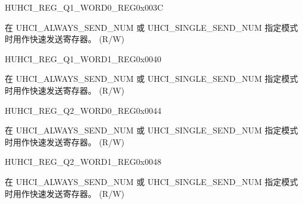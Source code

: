 \begin{register}{H}{UHCI\_REG\_Q1\_WORD0\_REG}{0x003C}\label{regdesc:UHCIREGQ1WORD0REG}
%
\regnewline%
\begin{regdesc}\begin{reglist}
\label{fielddesc:UHCISENDQ1WORD0}\item [UHCI\_SEND\_Q1\_WORD0] 在 UHCI\_ALWAYS\_SEND\_NUM 或 UHCI\_SINGLE\_SEND\_NUM 指定模式时用作快速发送寄存器。 (R/W)
\end{reglist}\end{regdesc}
\end{register}


\begin{register}{H}{UHCI\_REG\_Q1\_WORD1\_REG}{0x0040}\label{regdesc:UHCIREGQ1WORD1REG}
%
\regnewline%
\begin{regdesc}\begin{reglist}
\label{fielddesc:UHCISENDQ1WORD1}\item [UHCI\_SEND\_Q1\_WORD1] 在 UHCI\_ALWAYS\_SEND\_NUM 或 UHCI\_SINGLE\_SEND\_NUM 指定模式时用作快速发送寄存器。 (R/W)
\end{reglist}\end{regdesc}
\end{register}


\begin{register}{H}{UHCI\_REG\_Q2\_WORD0\_REG}{0x0044}\label{regdesc:UHCIREGQ2WORD0REG}
%
\regnewline%
\begin{regdesc}\begin{reglist}
\label{fielddesc:UHCISENDQ2WORD0}\item [UHCI\_SEND\_Q2\_WORD0] 在 UHCI\_ALWAYS\_SEND\_NUM 或 UHCI\_SINGLE\_SEND\_NUM 指定模式时用作快速发送寄存器。 (R/W)
\end{reglist}\end{regdesc}
\end{register}


\begin{register}{H}{UHCI\_REG\_Q2\_WORD1\_REG}{0x0048}\label{regdesc:UHCIREGQ2WORD1REG}
%
\regnewline%
\begin{regdesc}\begin{reglist}
\label{fielddesc:UHCISENDQ2WORD1}\item [UHCI\_SEND\_Q2\_WORD1] 在 UHCI\_ALWAYS\_SEND\_NUM 或 UHCI\_SINGLE\_SEND\_NUM 指定模式时用作快速发送寄存器。 (R/W)
\end{reglist}\end{regdesc}
\end{register}


